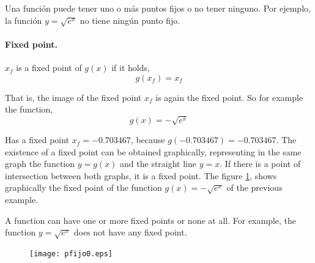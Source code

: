 \begin{paracol}{2}
Una función puede tener uno o más puntos fijos o no tener ninguno. Por ejemplo, la función $y=\sqrt{e^x}$ no tiene ningún punto fijo.

\switchcolumn
\paragraph{Fixed point.}  $x_f$ is a fixed point of $g(x)$ if it holds,
\begin{equation*}
g(x_f)=x_f
\end{equation*}

That is, the image of the fixed point $x_f$ is again the fixed point. So for example the function,
\begin{equation*}
g(x)=-\sqrt{e^x}
\end{equation*}

Has a fixed point  $x_f=-0.703467$, because $g(-0.703467)=-0.703467$. The existence of a fixed point can be obtained graphically, representing in the same graph the function $y=g(x)$ and the straight line $y=x$. If there is a point of intersection between both graphs, it is a fixed point. The figure \ref{fig:pfijo0}, shows graphically the fixed point of the function $g(x)=-\sqrt{e^x}$ of the previous example.

A function can have one or more fixed points or none at all. For example, the function $y=\sqrt{e^x}$ does not have any fixed point.
\end{paracol}

\begin{figure}[h]
\texttt{[image: pfijo0.eps]}
\label{fig:pfijo0}
\end{figure}



